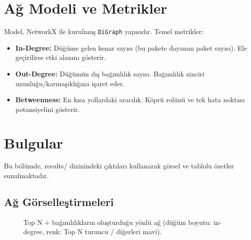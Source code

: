 \documentclass[11pt,a4paper]{article}
\begin{document}
\section{Ağ Modeli ve Metrikler}
Model, NetworkX ile kurulmuş \texttt{DiGraph} yapısıdır. Temel metrikler:
\begin{itemize}
  \item \textbf{In-Degree:} Düğüme gelen kenar sayısı (bu pakete dayanan paket sayısı). Ele geçirilirse etki alanını gösterir.
  \item \textbf{Out-Degree:} Düğümün dış bağımlılık sayısı. Bağımlılık zinciri uzunluğu/karmaşıklığına işaret eder.
  \item \textbf{Betweenness:} En kısa yollardaki aracılık. Köprü rolünü ve tek hata noktası potansiyelini gösterir.
\end{itemize}

\section{Bulgular}
Bu bölümde, results/ dizinindeki çıktıları kullanarak görsel ve tablolu özetler sunulmaktadır.

\subsection{Ağ Görselleştirmeleri}
\begin{figure}[h]
  \centering
  \caption{Top N + bağımlılıkların oluşturduğu yönlü ağ (düğüm boyutu: in-degree, renk: Top N turuncu / diğerleri mavi).}
\end{figure}
\end{document}
